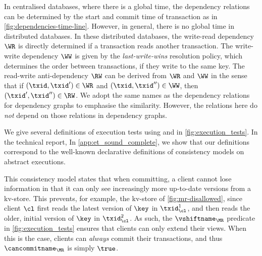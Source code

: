 

\noindent 
In centralised databases, where there is a global time, 
the dependency relations can be determined by the start and commit time of transaction as in \cref{fig:dependencies-time-line}.
However, in general, there is no global time in distributed databases.
In these distributed databases,
the write-read dependency \( \WR \) is directly determined if a transaction reads another transaction.
The write-write dependency \( \WW \) is given by the \emph{last-write-wins} resolution policy,
which determines the order between transactions, if they write to the same key.
The read-write anti-dependency \( \RW \) can be derived from \( \WR \) and \( \WW \) in the sense that
if \( (\txid, \txid') \in \WR \) and \( (\txid, \txid'') \in \WW \), then  \( (\txid',\txid'') \in \RW \).
We adopt the same names as the dependency relations for dependency graphs \citep{adya}
to emphasise the similarity.
However, the relations here do \emph{not} depend on those relations in dependency graphs.

We give several definitions of
execution tests using \vshiftname and \cancommitname in \cref{fig:execution_tests}. 
\ifTechRepEdits%
In the technical report,
\else%
In \cref{app:et_sound_complete},
\fi
we show that our definitions correspond to
the well-known declarative definitions of consistency models on abstract executions.



This consistency model states that when committing, a client
cannot lose information in that it can only see increasingly more up-to-date versions from a kv-store.
This prevents, for example, the kv-store of \cref{fig:mr-disallowed},
since client \(\cl\) first reads the latest version of \(\key\) in \(\txid_{\cl}^{1}\), 
and then reads the older, initial version of \(\key\) in \(\txid_{\cl}^{2}\).  
As such, the \(\vshiftname_{\MR}\) predicate in \cref{fig:execution_tests} ensures that clients  can only extend their views. 
When this is the case, clients can \emph{always} commit their transactions, and thus \(\cancommitname_{\MR}\) is simply \(\true\). 

